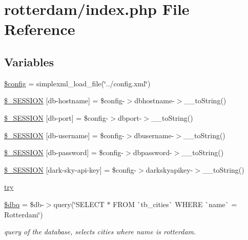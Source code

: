 \hypertarget{rotterdam_2index_8php}{}\section{rotterdam/index.php File Reference}
\label{rotterdam_2index_8php}
\subsection*{Variables}
\begin{DoxyCompactItemize}
\item 
\mbox{\hyperlink{rotterdam_2index_8php_a49c7011be9c979d9174c52a8b83e5d8e}{\$config}} = simplexml\+\_\+load\+\_\+file(\char`\"{}../config.\+xml\char`\"{})
\item 
\mbox{\hyperlink{rotterdam_2index_8php_a2204e38201e377d62677f13b1a9fbd97}{\$\+\_\+\+S\+E\+S\+S\+I\+ON}} \mbox{[}\textquotesingle{}db-\/hostname\textquotesingle{}\mbox{]} = \$config-\/$>$dbhostname-\/$>$\+\_\+\+\_\+to\+String()
\item 
\mbox{\hyperlink{rotterdam_2index_8php_a9c0a33c1d865bc2705937df84d037856}{\$\+\_\+\+S\+E\+S\+S\+I\+ON}} \mbox{[}\textquotesingle{}db-\/port\textquotesingle{}\mbox{]} = \$config-\/$>$dbport-\/$>$\+\_\+\+\_\+to\+String()
\item 
\mbox{\hyperlink{rotterdam_2index_8php_a22b01b4f5ad2c75f89289926c55b8eb7}{\$\+\_\+\+S\+E\+S\+S\+I\+ON}} \mbox{[}\textquotesingle{}db-\/username\textquotesingle{}\mbox{]} = \$config-\/$>$dbusername-\/$>$\+\_\+\+\_\+to\+String()
\item 
\mbox{\hyperlink{rotterdam_2index_8php_a0b6acdb2eec8adedd51284ac5a5a9748}{\$\+\_\+\+S\+E\+S\+S\+I\+ON}} \mbox{[}\textquotesingle{}db-\/password\textquotesingle{}\mbox{]} = \$config-\/$>$dbpassword-\/$>$\+\_\+\+\_\+to\+String()
\item 
\mbox{\hyperlink{rotterdam_2index_8php_a6ec14c128bfe7633c023f7e99db766a2}{\$\+\_\+\+S\+E\+S\+S\+I\+ON}} \mbox{[}\textquotesingle{}dark-\/sky-\/api-\/key\textquotesingle{}\mbox{]} = \$config-\/$>$darkskyapikey-\/$>$\+\_\+\+\_\+to\+String()
\item 
\mbox{\hyperlink{rotterdam_2index_8php_abe4cc9788f52e49485473dc699537388}{try}}
\item 
\mbox{\hyperlink{rotterdam_2index_8php_ab76933014035168a37e7e525ca8fbabe}{\$dbq}} = \$db-\/$>$query(\char`\"{}S\+E\+L\+E\+CT $\ast$ F\+R\+OM \`{}tb\+\_\+cities\`{} W\+H\+E\+RE \`{}name\`{} = \textquotesingle{}Rotterdam\textquotesingle{}\char`\"{})
\begin{DoxyCompactList}\small\item\em query of the database, selects cities where name is rotterdam. \end{DoxyCompactList}\item 

\end{DoxyCompactItemize}
